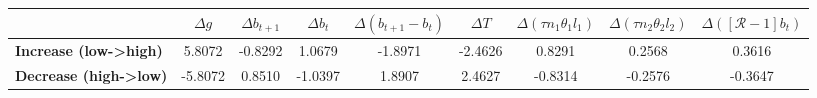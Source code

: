 \begin{tiny}\begin{tabular}{|l|c|c|c|c|c|c|c|c|}
\hline
&\textbf{$\Delta g$}&\textbf{$\Delta b_{t+1}$}&\textbf{$\Delta b_{t}$}&\textbf{$\Delta (b_{t+1}-b_{t})$}&\textbf{$\Delta T$}&\textbf{$\Delta (\tau n_1\theta_1 l_1 )$}&\textbf{$\Delta (\tau n_2\theta_2 l_2)$}&\textbf{$\Delta ([\mathcal{R}-1]b_t)$}\\\hline
\textbf{Increase (low->high)}&5.8072&-0.8292&1.0679&-1.8971&-2.4626&0.8291&0.2568&0.3616\\\hline
\textbf{Decrease (high->low)}&-5.8072&0.8510&-1.0397&1.8907&2.4627&-0.8314&-0.2576&-0.3647\\\hline
\end{tabular}
\end{tiny}